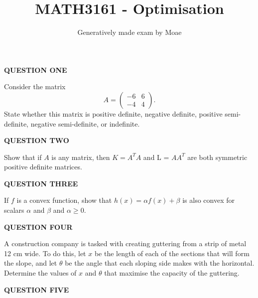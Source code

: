 \documentclass[11pt]{article}
\title{ MATH3161 - Optimisation}
\author{ Generatively made exam by Moae }
\begin{document}
    \maketitle
    
    \Large \textbf{QUESTION ONE}

    \vspace{5pt}

    \normalsize Consider the matrix $$A =\begin{pmatrix}-6&6\\-4&4\end{pmatrix}.$$ State whether this matrix is positive definite, negative definite, positive semi-definite, negative semi-definite, or indefinite.

    \vspace{20pt}
    
    \Large \textbf{QUESTION TWO}

    \vspace{5pt}

    \normalsize Show that if $A$ is any matrix, then $K = A^T A$ and L = $AA^T$ are both symmetric positive definite matrices.

    \vspace{20pt}
    
    \Large \textbf{QUESTION THREE}

    \vspace{5pt}

    \normalsize If $f$ is a convex function, show that $h(x) = \alpha f(x) + \beta$ is also convex for scalars $\alpha$ and $\beta$ and $\alpha \geq 0$.

    \vspace{20pt}
    
    \Large \textbf{QUESTION FOUR}

    \vspace{5pt}

    \normalsize A construction company is tasked with creating guttering from a strip of metal 12 cm wide. To do this, let $x$ be the length of each of the sections that will form the slope, and let $\theta$ be the angle that each sloping side makes with the horizontal. Determine the values of $x$ and $\theta$ that maximise the capacity of the guttering.

    \vspace{20pt}
    
    \Large \textbf{QUESTION FIVE}

    \vspace{5pt}
\end{document}
